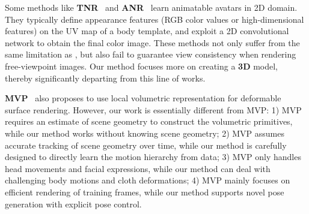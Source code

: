 

Some methods like \textbf{TNR}~\cite{Shysheya2019TNR} and \textbf{ANR}~\cite{raj2020anr} learn animatable avatars in 2D domain. They typically define appearance features (RGB color values or high-dimensional features) on the UV map of a body template, and exploit a 2D convolutional network to obtain the final color image. These methods not only suffer from the same limitation as \cite{peng2021animatable_nerf,neural_actors}, but also fail to guarantee view consistency when rendering free-viewpoint images. Our method focuses more on creating a \textbf{3D} model, thereby significantly departing from this line of works. 




\textbf{MVP}~\cite{Lombardi2021MVP} also proposes to use local volumetric representation for deformable surface rendering. However, our work is essentially different from MVP:
1) MVP requires an estimate of scene geometry to construct the volumetric primitives, while our method works without knowing scene geometry; 
2) MVP assumes accurate tracking of scene geometry over time, while our method is carefully designed to directly learn the motion hierarchy from data; 
3) MVP only handles head movements and facial expressions, while our method can deal with challenging body motions and cloth deformations;  
4) MVP mainly focuses on efficient rendering of training frames, while our method supports novel pose generation with explicit pose control. 



